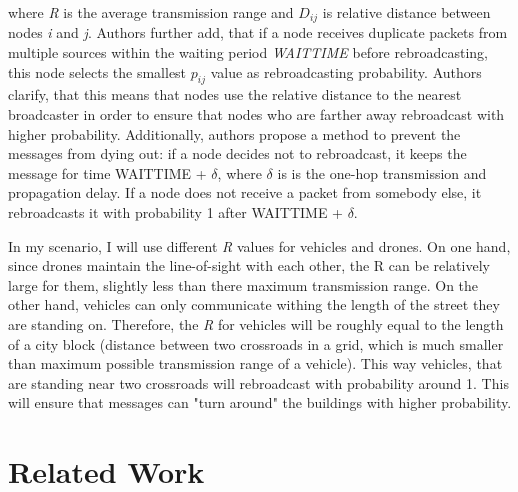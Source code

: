 \documentclass[]{nsm-thesis}
\begin{document}
where \emph{R} is the average transmission range and $D_{ij}$ is relative distance between nodes \emph{i} and \emph{j}. Authors further add, that if a node receives duplicate packets from multiple sources within the waiting period \emph{WAIT\textunderscore TIME} before rebroadcasting, this node selects the smallest $p_{ij}$ value as rebroadcasting probability. Authors clarify, that this means that nodes use the relative distance to the nearest broadcaster in order to ensure that nodes who are farther away rebroadcast with higher probability. Additionally, authors propose a method to prevent the messages from dying out: if a node decides not to rebroadcast, it keeps the message for time WAIT\textunderscore TIME + $\delta$, where $\delta$ is is the one-hop transmission and propagation delay. If a node does not receive a packet from somebody else, it rebroadcasts it with probability 1 after WAIT\textunderscore TIME + $\delta$.

In my scenario, I will use different \emph{R} values for vehicles and drones. On one hand, since drones maintain the line-of-sight with each other, the R can be relatively large for them, slightly less than there maximum transmission range. On the other hand, vehicles can only communicate withing the length of the street they are standing on. Therefore, the \emph{R} for vehicles will be roughly equal to the length of a city block (distance between two crossroads in a grid, which is much smaller than maximum possible transmission range of a vehicle). This way vehicles, that are standing near two crossroads will rebroadcast with probability around 1. This will ensure that messages can "turn around" the buildings with higher probability.



\section {Related Work}

\end{document}
